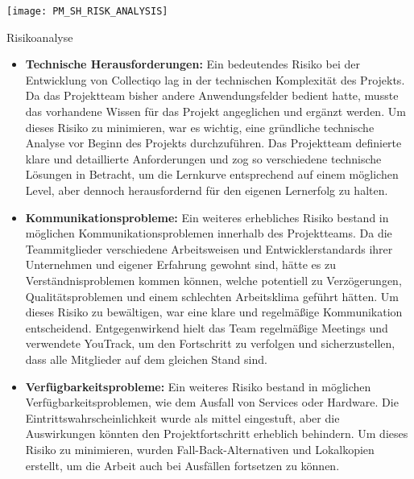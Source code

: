 \begin{table}[h!]
    \centering
    \texttt{[image: PM\_SH\_RISK\_ANALYSIS]}
    \caption{Risikoanalyse}\label{tab:risikoanalyse}
\end{table}

\begin{itemize}[itemsep=1em, leftmargin=*]
    \item \textbf{Technische Herausforderungen:} Ein bedeutendes Risiko bei der Entwicklung von Collectiqo lag in der technischen Komplexität des Projekts.
    Da das Projektteam bisher andere Anwendungsfelder bedient hatte, musste das vorhandene Wissen für das Projekt angeglichen und ergänzt werden.
    Um dieses Risiko zu minimieren, war es wichtig, eine gründliche technische Analyse vor Beginn des Projekts durchzuführen.
    Das Projektteam definierte klare und detaillierte Anforderungen und zog so verschiedene technische Lösungen in Betracht, um die Lernkurve entsprechend auf einem möglichen Level, aber dennoch herausfordernd für den eigenen Lernerfolg zu halten.

    \item \textbf{Kommunikationsprobleme:} Ein weiteres erhebliches Risiko bestand in möglichen Kommunikationsproblemen innerhalb des Projektteams.
    Da die Teammitglieder verschiedene Arbeitsweisen und Entwicklerstandards ihrer Unternehmen und eigener Erfahrung gewohnt sind, hätte es zu Verständnisproblemen kommen können, welche potentiell zu Verzögerungen, Qualitätsproblemen und einem schlechten Arbeitsklima geführt hätten.
    Um dieses Risiko zu bewältigen, war eine klare und regelmäßige Kommunikation entscheidend.
    Entgegenwirkend hielt das Team regelmäßige Meetings und verwendete YouTrack, um den Fortschritt zu verfolgen und sicherzustellen, dass alle Mitglieder auf dem gleichen Stand sind.

    \item \textbf{Verfügbarkeitsprobleme:} Ein weiteres Risiko bestand in möglichen Verfügbarkeitsproblemen, wie dem Ausfall von Services oder Hardware.
    Die Eintrittswahrscheinlichkeit wurde als mittel eingestuft, aber die Auswirkungen könnten den Projektfortschritt erheblich behindern.
    Um dieses Risiko zu minimieren, wurden Fall-Back-Alternativen und Lokalkopien erstellt, um die Arbeit auch bei Ausfällen fortsetzen zu können.
\end{itemize}


